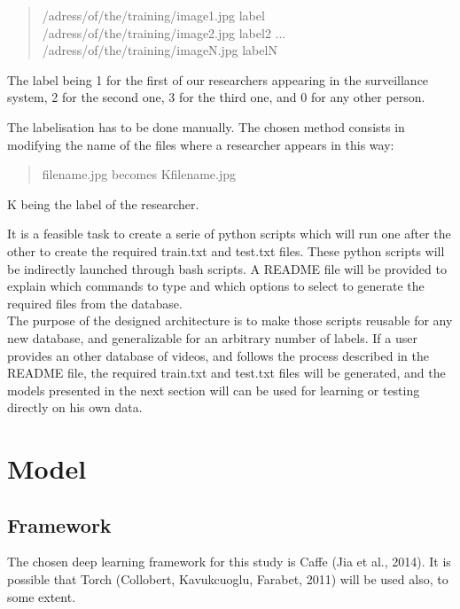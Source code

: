 \blockquote{/adress/of/the/training/image1.jpg label\newline
/adress/of/the/training/image2.jpg label2\newline
...\newline
/adress/of/the/training/imageN.jpg labelN}

The label being 1 for the first of our researchers appearing in the surveillance system, 2 for the second one, 3 for the third one, and 0 for any other person.

The labelisation has to be done manually. The chosen method consists in modifying the name of the files where a researcher appears in this way:

\blockquote{filename.jpg becomes Kfilename.jpg}

K being the label of the researcher.

It is a feasible task to create a serie of python scripts which will run one after the other to create the required train.txt and test.txt files. These python scripts will be indirectly launched through bash scripts. A README file will be provided to explain which commands to type and which options to select to generate the required files from the database.\\

The purpose of the designed architecture is to make those scripts reusable for any new database, and generalizable for an arbitrary number of labels. If a user provides an other database of videos, and follows the process described in the README file, the required train.txt and test.txt files will be generated, and the models presented in the next section will can be used for learning or testing directly on his own data.

\section{Model}

\subsection{Framework}
The chosen deep learning framework for this study is Caffe (Jia et al., 2014). It is possible that Torch (Collobert, Kavukcuoglu, Farabet, 2011) will be used also, to some extent.\\

